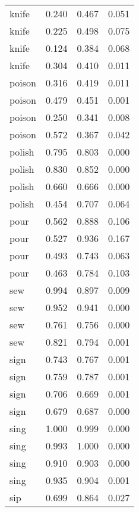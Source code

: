 \begin{longtable}{l|rrr}
knife     & 0.240   & 0.467     & 0.051         \\
knife     & 0.225  & 0.498     & 0.075         \\
knife     & 0.124  & 0.384     & 0.068         \\
knife     & 0.304  & 0.410      & 0.011         \\
poison    & 0.316  & 0.419     & 0.011         \\
poison    & 0.479  & 0.451     & 0.001         \\
poison    & 0.250   & 0.341     & 0.008         \\
poison    & 0.572  & 0.367     & 0.042         \\
polish    & 0.795  & 0.803     & 0.000             \\
polish    & 0.830   & 0.852     & 0.000             \\
polish    & 0.660   & 0.666     & 0.000             \\
polish    & 0.454  & 0.707     & 0.064         \\
pour      & 0.562  & 0.888     & 0.106         \\
pour      & 0.527  & 0.936     & 0.167         \\
pour      & 0.493  & 0.743     & 0.063         \\
pour      & 0.463  & 0.784     & 0.103         \\
sew       & 0.994  & 0.897     & 0.009         \\
sew       & 0.952  & 0.941     & 0.000             \\
sew       & 0.761  & 0.756     & 0.000             \\
sew       & 0.821  & 0.794     & 0.001         \\
sign      & 0.743  & 0.767     & 0.001         \\
sign      & 0.759  & 0.787     & 0.001         \\
sign      & 0.706  & 0.669     & 0.001         \\
sign      & 0.679  & 0.687     & 0.000             \\
sing      & 1.000      & 0.999     & 0.000             \\
sing      & 0.993  & 1.000         & 0.000             \\
sing      & 0.910   & 0.903     & 0.000             \\
sing      & 0.935  & 0.904     & 0.001         \\
sip       & 0.699  & 0.864     & 0.027         \\

\end{longtable}
